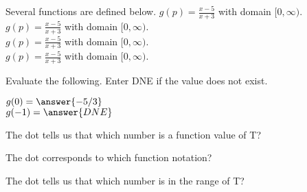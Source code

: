 \documentclass{ximera}
\begin{document}
\begin{definition}
Several functions are defined below.
$g(p) = \frac{x-5}{x+3}$ with domain $[0, \infty)$. \\
$g(p) = \frac{x-5}{x+3}$ with domain $[0, \infty)$. \\
$g(p) = \frac{x-5}{x+3}$ with domain $[0, \infty)$. \\
$g(p) = \frac{x-5}{x+3}$ with domain $[0, \infty)$. \\

\end{definition}



\begin{exercise}
Evaluate the following.  Enter DNE if the value does not exist.

$g(0) = \answer{-5/3}$  \\
$g(-1) = \answer{DNE}$


\end{exercise}






\begin{exercise}
The dot tells us that which number is a function value of T?

\begin{selectAll}
\end{selectAll}

\end{exercise}




\begin{exercise}
The dot corresponds to which function notation? 

\begin{selectAll}
\end{selectAll}

\end{exercise}





\begin{exercise}
The dot tells us that which number is in the range of T?

\begin{selectAll}
\end{selectAll}

\end{exercise}
\end{document}
